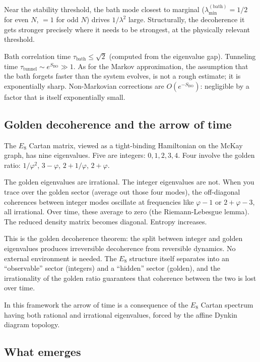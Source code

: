 Near the stability threshold, the bath mode closest to marginal
($\lambda_{\min}^{(\text{bath})} = 1/2$ for even $N$, $= 1$ for odd
$N$) drives $1/\lambda^2$ large. Structurally, the decoherence it
gets stronger precisely where it needs to be strongest, at the
physically relevant threshold.

Bath correlation time $\tau_{\text{bath}} \le \sqrt{2}$ (computed
from the eigenvalue gap). Tunneling time
$\tau_{\text{tunnel}} \sim e^{S_{\text{BO}}} \gg 1$. As for the Markov
approximation, the assumption that the bath forgets faster than the
system evolves, is not a rough estimate; it is exponentially sharp.
Non-Markovian corrections are $O(e^{-S_{\text{BO}}})$: negligible by a
factor that is itself exponentially small.

\subsection*{Golden decoherence and the arrow of time}

The $E_8$ Cartan matrix, viewed as a tight-binding Hamiltonian on the
McKay graph, has nine eigenvalues. Five are integers: $0, 1, 2, 3, 4$.
Four involve the golden ratio: $1/\varphi^2$, $3 - \varphi$,
$2 + 1/\varphi$, $2 + \varphi$.

The golden eigenvalues are irrational. The integer eigenvalues are not.
When you trace over the golden sector (average out those four modes),
the off-diagonal coherences between integer modes oscillate at
frequencies like $\varphi - 1$ or $2 + \varphi - 3$, all irrational.
Over time, these average to zero (the Riemann-Lebesgue lemma).
The reduced density matrix becomes diagonal. Entropy increases.

This is the golden decoherence theorem: the split between integer
and golden eigenvalues produces irreversible decoherence from
reversible dynamics. No external environment is needed. The $E_8$
structure itself separates into an ``observable'' sector (integers)
and a ``hidden'' sector (golden), and the irrationality of the golden
ratio guarantees that coherence between the two is lost over time.

In this framework the arrow of time is a
consequence of the $E_8$ Cartan spectrum having both rational and
irrational eigenvalues, forced by the affine Dynkin diagram topology.

\subsection*{What emerges}

